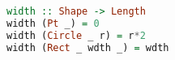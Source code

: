 \begin{lstlisting}[language=haskell]
width :: Shape -> Length
width (Pt _) = 0
width (Circle _ r) = r*2
width (Rect _ wdth _) = wdth
\end{lstlisting}